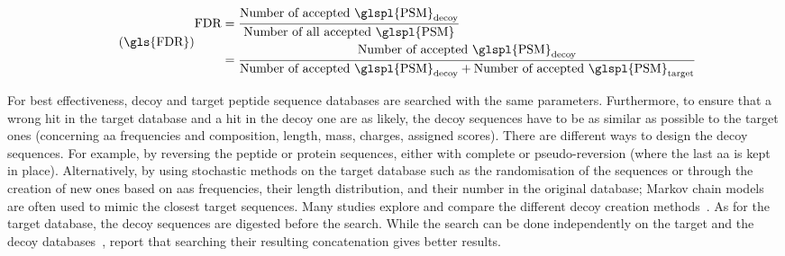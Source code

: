 \begin{equation}\label{eq:fdr-prot}
    \tag{\gls{FDR}}
    \begin{split}
        {\text{FDR}} & =\frac{\text{Number of accepted \glspl{PSM}}_{\text{decoy}}}%
    {\text{Number of all accepted \glspl{PSM}}}\\
          & =\frac{\text{Number of accepted \glspl{PSM}}_{\text{decoy}}}%
    {\text{Number of accepted \glspl{PSM}}_{\text{decoy}}+\text{Number of accepted \glspl{PSM}}_{\text{target}}}
\end{split}
\raisetag{4\normalbaselineskip}
\end{equation}
\begin{comment}
\vspace{-6mm}
where:
{\small
\begin{itemize}[topsep=0pt,nosep]
    \item $\text{\emph{Number of accepted \glspl{PSM}}}_{\text{decoy}}$
is the number of \glspl{PSM} from decoy sequences
that are above a specified threshold $\mathcal{t}$,
    \item $\text{\emph{Number of all accepted \glspl{PSM}}}$
is the total number of accepted \glspl{PSM}
above the specified threshold $\mathcal{t}$,
including the accepted decoy \glspl{PSM}.
    \item $\text{\emph{Number of accepted \glspl{PSM}}}_{\text{target}}$
is the number of accepted \glspl{PSM} above the specified threshold $\mathcal{t}$.
\end{itemize}
}
\end{comment}

\vspace{-4mm}
For best effectiveness,
decoy and target peptide sequence databases are searched with the same parameters.
Furthermore, to ensure that
a wrong hit in the target database and a hit in the decoy one are as likely,
the decoy sequences have to be as similar as possible to the target ones
(concerning \gls{aa} frequencies and composition,
length, mass, charges, assigned scores).
There are different ways to design the decoy sequences.
For example, by reversing the peptide or protein sequences,
either with complete or pseudo-reversion (where the last \gls{aa} is kept in place).
Alternatively, by using stochastic methods on the target database
such as the randomisation of the sequences or
through the creation of new ones based on \glspl{aa} frequencies,
their length distribution,
and their number in the original database;
Markov chain models~ are often used
to mimic the closest target sequences.
Many studies explore and compare the different decoy creation
methods~.
As for the target database,
the decoy sequences are digested  before the search.
While the search can be done independently
on the target and the decoy databases~,
\citet*{Elias2007-wi} report that
searching their resulting concatenation gives better results.

